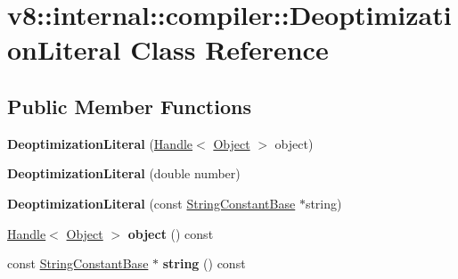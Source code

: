 \hypertarget{classv8_1_1internal_1_1compiler_1_1DeoptimizationLiteral}{}\section{v8\+:\+:internal\+:\+:compiler\+:\+:Deoptimization\+Literal Class Reference}
\label{classv8_1_1internal_1_1compiler_1_1DeoptimizationLiteral}
\subsection*{Public Member Functions}
\begin{DoxyCompactItemize}
\item 
\mbox{\label{classv8_1_1internal_1_1compiler_1_1DeoptimizationLiteral_a0326525fa853287b3f5dc4538fc43ac2}} 
{\bfseries Deoptimization\+Literal} (\mbox{\hyperlink{classv8_1_1internal_1_1Handle}{Handle}}$<$ \mbox{\hyperlink{classv8_1_1internal_1_1Object}{Object}} $>$ object)
\item 
\mbox{\label{classv8_1_1internal_1_1compiler_1_1DeoptimizationLiteral_a00106d95635b0124c84cf10e82a9d819}} 
{\bfseries Deoptimization\+Literal} (double number)
\item 
\mbox{\label{classv8_1_1internal_1_1compiler_1_1DeoptimizationLiteral_a5ec55ab3bcff972af1f71c8b2fa9393d}} 
{\bfseries Deoptimization\+Literal} (const \mbox{\hyperlink{classv8_1_1internal_1_1StringConstantBase}{String\+Constant\+Base}} $\ast$string)
\item 
\mbox{\label{classv8_1_1internal_1_1compiler_1_1DeoptimizationLiteral_aec74245f5273e06d10421beebab3f7b4}} 
\mbox{\hyperlink{classv8_1_1internal_1_1Handle}{Handle}}$<$ \mbox{\hyperlink{classv8_1_1internal_1_1Object}{Object}} $>$ {\bfseries object} () const
\item 
\mbox{\label{classv8_1_1internal_1_1compiler_1_1DeoptimizationLiteral_a3cca7756c52224491a7b4a8bffa49636}} 
const \mbox{\hyperlink{classv8_1_1internal_1_1StringConstantBase}{String\+Constant\+Base}} $\ast$ {\bfseries string} () const

\end{DoxyCompactItemize}
